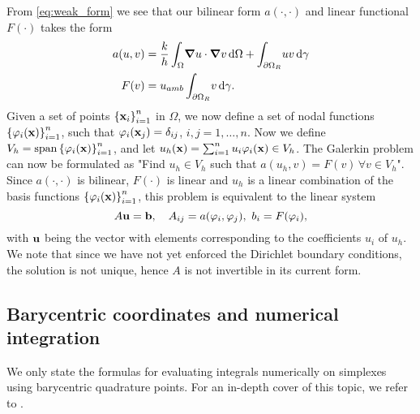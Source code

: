 From \eqref{eq:weak_form} we see that our bilinear form $a(\cdot,\cdot)$ and linear functional $F(\cdot)$ takes the form
\begin{align}
	a(u,v) &= \frac{k}{h}\int_\Omega \! \grad{u}\cdot\grad{v} \, \mathrm{d}\Omega + \int_{\partial\Omega_R} \! uv\, \mathrm{d}\gamma \\
	F(v) &= u_{amb}\int_{\partial\Omega_R} \! v \, \mathrm{d}\gamma.
	\label{eq:bilin_form}
\end{align}
Given a set of points $\left\{\vb{x}_i\right\}_{i=1}^n$ in $\Omega$, we now define a set of nodal functions $\left\{\varphi_i(\vb{x})\right\}_{i=1}^n$, such that $\varphi_i(\vb{x}_j) = \delta_{ij}$, $i,j = 1,\dots,n$. Now we define $V_h = \operatorname{span}\left\{\varphi_i(\vb{x})\right\}_{i=1}^n$, and let $u_h(\vb{x}) = \sum_{i=1}^{n} u_i \varphi_i(\vb{x}) \in V_h$. The Galerkin problem can now be formulated as "Find $u_h \in V_h$ such that $a(u_h,v) = F(v)\, \forall v \in V_h$". Since $a(\cdot,\cdot)$ is bilinear, $F(\cdot)$ is linear and $u_h$  is a linear combination of the basis functions $\left\{\varphi_i(\vb{x})\right\}_{i=1}^n$, this problem is equivalent to the linear system
\begin{equation}
	A\vb{u} = \vb{b}, \quad A_{ij} = a(\varphi_i,\varphi_j), \,\, b_i = F(\varphi_i)
	\label{eq:lin_sys},
\end{equation}
with $\vb{u}$ being the vector with elements corresponding to the coefficients $u_i$ of $u_h$. We note that since we have not yet enforced the Dirichlet boundary conditions, the solution is not unique, hence $A$ is not invertible in its current form.

\subsection{Barycentric coordinates and numerical integration}
We only state the formulas for evaluating integrals numerically on simplexes using barycentric quadrature points. For an in-depth cover of this topic, we refer to \cite{quarteroni}.

